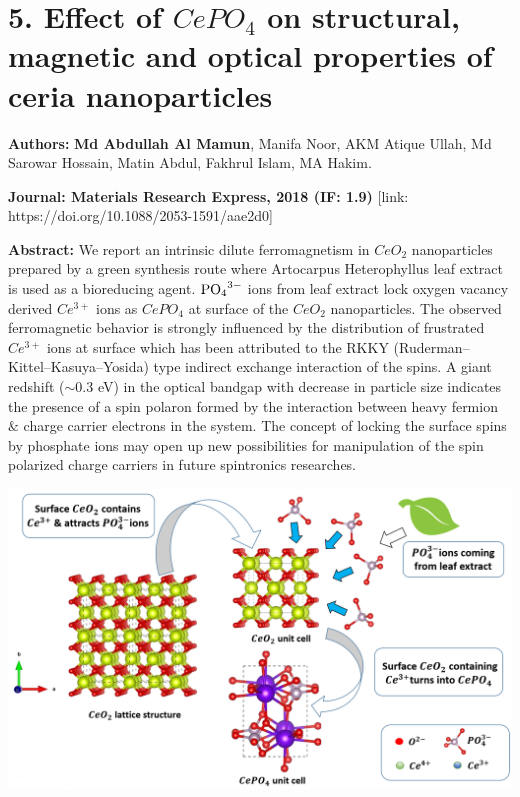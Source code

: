 \documentclass[a4paper,20pt]{article}
\begin{document}
\section{\textbf{5. Effect of $CePO_4$ on structural, magnetic and optical properties of ceria nanoparticles}}

\textbf{Authors:} \textbf{Md Abdullah Al Mamun}, Manifa Noor, AKM Atique Ullah, Md Sarowar Hossain, Matin Abdul, Fakhrul Islam, MA Hakim. \\ \vspace{3pt}

\textbf{Journal: Materials Research Express, 2018 (IF: 1.9)} [link: https://doi.org/10.1088/2053-1591/aae2d0] \\ \vspace{5pt}

    \begin{minipage}{.59\linewidth} \begin{flushleft}
    
    		\textbf{Abstract:} We report an intrinsic dilute ferromagnetism in $CeO_2$ nanoparticles prepared by a green synthesis route where Artocarpus Heterophyllus leaf extract is used as a bioreducing agent. ${{{\rm{PO}}}_{4}}^{3-}$ ions from leaf extract lock oxygen vacancy derived $Ce^{3+}$ ions as $CePO_4$ at surface of the $CeO_2$ nanoparticles. The observed ferromagnetic behavior is strongly influenced by the distribution of frustrated $Ce^{3+}$ ions at surface which has been attributed to the RKKY (Ruderman–Kittel–Kasuya–Yosida) type indirect exchange interaction of the spins. A giant redshift ($\sim$0.3 eV) in the optical bandgap with decrease in particle size indicates the presence of a spin polaron formed by the interaction between heavy fermion $\&$ charge carrier electrons in the system. The concept of locking the surface spins by phosphate ions may open up new possibilities for manipulation of the spin polarized charge carriers in future spintronics researches.
    	\end{flushleft} \end{minipage}
    \hfill 
    \begin{minipage}{0.4\linewidth}\begin{flushright}
    	 	\includegraphics[width=1.0\linewidth]{mrx}\\
    	\end{flushright}\end{minipage}
    	 
\end{document}

